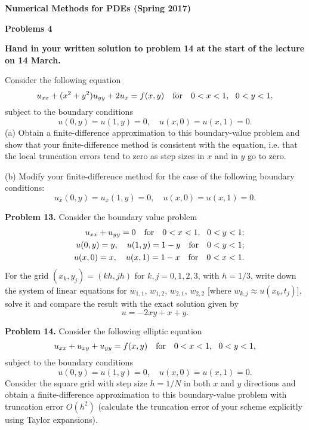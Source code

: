 \documentclass[10pt]{article}
\begin{document}
\begin{center}
{\large{\bf Numerical Methods for PDEs (Spring 2017)}}
\end{center}

\begin{center}
{\large{\bf Problems 4}}
\end{center}

\noindent
{\bf Hand in your written solution to problem 14 at the start of the lecture on 14 March.}

\vskip 0.5cm  Consider the following equation
\begin{equation}
u_{xx}+(x^2+y^2)u_{yy}+2u_{x}= f(x,y) \quad \hbox{for} \quad
0<x<1, \ \ 0< y < 1, \label{4}
\end{equation}
subject to the boundary conditions
\begin{equation}
u(0,y)=u(1, y)=0, \quad u(x,0)=u(x,1)=0. \label{5}
\end{equation}
(a) Obtain a finite-difference approximation to this boundary-value
problem and show that your finite-difference method is consistent with the equation,
i.e. that the local truncation errors tend to zero as step sizes in $x$ and in $y$
go to zero.

\vskip 0.3cm \noindent
(b) Modify your finite-difference method for the case of the following boundary conditions:
\begin{equation}
u_{x}(0,y)=u_{x}(1, y)=0, \quad u(x,0)=u(x,1)=0. \label{5b}
\end{equation}



\vskip 0.5cm \noindent
{\bf Problem 13.} Consider the boundary value problem
\begin{eqnarray}
&&u_{xx}+ u_{yy} = 0 \quad
{\rm for} \quad 0< x< 1, \ \ 0< y< 1;  \nonumber \\
&&u(0,y)=y, \quad u(1,y)=1-y \quad {\rm for} \quad 0< y< 1;  \nonumber \\
&&u(x,0)=x, \quad u(x,1)=1-x \quad {\rm for} \quad 0< x< 1.  \label{6}
\end{eqnarray}
For the grid $(x_{k},y_{j})=(kh,jh)$ for $k,j=0,1,2,3$, with $h=1/3$,
write down the system of linear equations for $w_{1,1}$,
$w_{1,2}$, $w_{2,1}$, $w_{2,2}$ [where $w_{k,j}\approx u(x_{k},t_{j})$],
solve it and compare the result with the exact solution given by
\[
u=-2xy+x+y.
\]

\vskip 5mm
\noindent
{\bf Problem 14.} Consider the following
elliptic equation
\begin{equation}
u_{xx}+u_{xy}+u_{yy}=
f(x,y) \quad \hbox{for} \quad 0<x<1, \ \ 0< y < 1, \label{7}
\end{equation}
subject to the boundary conditions
\begin{equation}
u(0,y)=u(1, y)=0, \quad u(x,0)=u(x,1)=0. \label{8}
\end{equation}
Consider the square grid with step size $h=1/N$ in both $x$ and $y$ directions and
obtain a finite-difference approximation to this boundary-value
problem with truncation error $O(h^2)$ (calculate the truncation error of your scheme explicitly using Taylor expansions).
\end{document}
